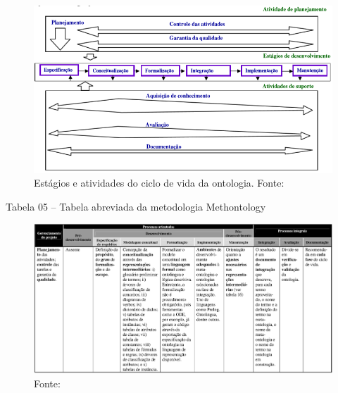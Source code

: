 \documentclass[a4paper]{report}
\begin{document}
\begin{figure}[h] 
\centering %
\includegraphics[scale=0.5]{Figuras/8.png} %
\caption[Estágios e atividades do ciclo de vida da ontologia]{Estágios e atividades do ciclo de vida da ontologia. Fonte: \cite{DanielaLucas2008}}
\end{figure}

\pagebreak
Tabela 05 – Tabela abreviada da metodologia Methontology

\begin{figure}[h] 
\centering %
\includegraphics[scale=0.4]{Figuras/9.png} %
\caption{Fonte: \cite{DanielaLucas2008}}
\end{figure}
\end{document}
